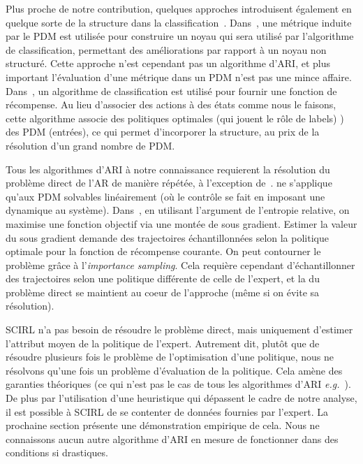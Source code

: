 \documentclass[english,utf8]{./hermes-journal}
\begin{document}
Plus proche de notre contribution, quelques approches introduisent également en quelque sorte de la structure dans la classification~\cite{Melo:2010}\cite{Ratliff:2006}. Dans~\cite{Melo:2010},
une métrique induite par le PDM est utilisée pour construire un noyau qui sera utilisé par l'algorithme de classification, permettant des améliorations par rapport à un noyau non structuré. Cette approche n'est cependant pas un algorithme d'ARI, et plus important l'évaluation d'une métrique dans un PDM n'est pas une mince affaire. Dans~\cite{Ratliff:2006}, un algorithme de classification est utilisé pour fournir une fonction de récompense. Au lieu d'associer des actions à des états comme nous le faisons, cette algorithme associe des politiques optimales (qui jouent le rôle de labels) ) des PDM (entrées), ce qui permet d'incorporer la structure, au prix de la résolution d'un grand nombre de PDM.

Tous les algorithmes d'ARI à notre connaissance requierent la résolution du problème direct de l'AR de manière répétée, à l'exception de~\cite{Dvij:2010,boularias:2011}.
\cite{Dvij:2010} ne s'applique qu'aux PDM solvables linéairement (où le contrôle se fait en imposant une dynamique au système).
Dans~\cite{boularias:2011}, en utilisant l'argument de l'entropie relative, on maximise une fonction objectif via une montée de sous gradient. Estimer la valeur du sous gradient demande des trajectoires échantillonnées selon la politique optimale pour la fonction de récompense courante. On peut contourner le problème grâce à l'\emph{importance sampling}. Cela requière cependant d'échantillonner des trajectoires selon une politique différente de celle de l'expert, et la du problème direct se maintient au coeur de l'approche (même si on évite sa résolution).

SCIRL n'a pas besoin de résoudre le problème direct, mais uniquement d'estimer l'attribut moyen de la politique de l'expert. Autrement dit, plutôt que de résoudre plusieurs fois le problème de l'optimisation d'une politique, nous ne résolvons qu'une fois un problème d'évaluation de la politique. Cela amène des garanties théoriques (ce qui n'est pas le cas de tous les algorithmes d'ARI \textit{e.g.}~\cite{boularias:2011}). De plus par l'utilisation d'une heuristique qui dépassent le cadre de notre analyse, il est possible à SCIRL de se contenter de données fournies par l'expert. La prochaine section présente une démonstration empirique de cela. Nous ne connaissons aucun autre algorithme d'ARI en mesure de fonctionner dans des conditions si drastiques.
\end{document}

